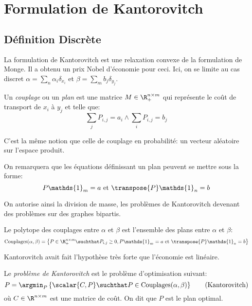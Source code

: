 \section{Formulation de Kantorovitch}
\subsection{Définition Discrète}
La formulation de Kantorovitch est une relaxation convexe de la formulation de Monge.
Il a obtenu un prix Nobel d'économie pour ceci.
Ici, on se limite au cas discret $\alpha = \sum_{n} \alpha_{i}\delta_{x_{i}}$ et $\beta = \sum_{m} b_{j}\delta_{y_{j}}$.

\begin{definition}
	Un \emph{couplage} ou un \emph{plan} est une matrice $M \in \R_{+}^{n \times m}$ qui représente le coût de transport de $x_{i}$ à $y_{j}$ et telle que:
	\begin{equation*}
		\sum_{j} P_{i, j} = a_{i} \land \sum_{i}P_{i, j} = b_{j}
	\end{equation*}
\end{definition}
\begin{remarque}
	C'est la même notion que celle de couplage en probabilité: un vecteur aléatoire sur l'espace produit.
\end{remarque}

On remarquera que les équations définissant un plan peuvent se mettre sous la forme:
\begin{equation*}
	P\mathds{1}_{m} = a \text{ et } \transpose{P}\mathds{1}_{n} = b
\end{equation*}

On autorise ainsi la division de masse, les problèmes de Kantorovitch devenant des problèmes sur des graphes bipartis.

\begin{definition}
	Le polytope des couplages entre $\alpha$ et $\beta$ est l'ensemble des plans entre $\alpha$ et $\beta$:
	\begin{equation*}
		\mathrm{Couplages}(\alpha, \beta) = \left\{P \in \R_{+}^{n \times m} \suchthat P_{i, j} \geq 0, P\mathds{1}_{m} = a \text{ et } \transpose{P}\mathds{1}_{n} = b\right\}
	\end{equation*}
\end{definition}

Kantorovitch avait fait l'hypothèse très forte que l'économie est linéaire.

\begin{definition}
	Le \emph{problème de Kantorovitch} est le problème d'optimisation suivant:
	\begin{equation}
		P = \argmin_{P} \left\{\scalar{C, P} \suchthat P \in \mathrm{Couplages}(\alpha, \beta)\right\} \tag{Kantorovitch}\label{eq:Kd}
	\end{equation}
	où $C \in \R^{n \times m}$ est une matrice de coût. On dit que $P$ est le plan optimal.
\end{definition}

